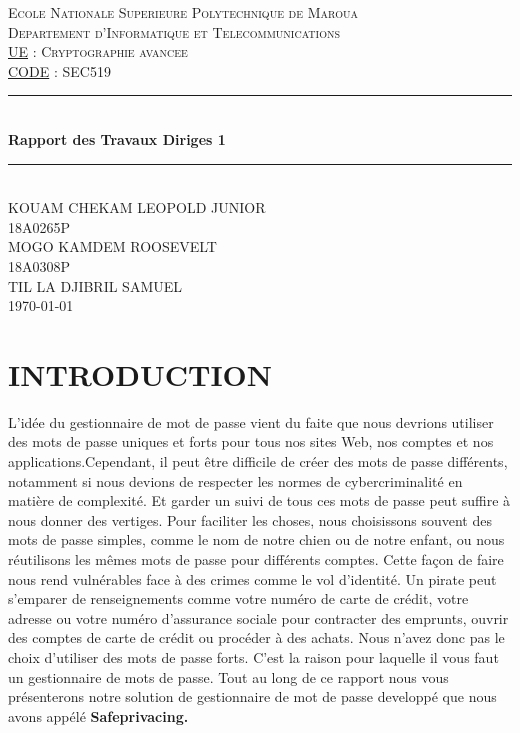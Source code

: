 \documentclass[11pt,a4paper]{report}
\begin{document}
\begin{titlepage}
\newcommand{\HRule}{\rule{\linewidth}{0.5mm}}
\center
\textsc{\LARGE
Ecole Nationale Superieure Polytechnique de Maroua
} \\[1cm]
\textsc{\Large
Departement d'Informatique et Telecommunications
} \\[1cm]
\textsc{\large
\underline{UE} : Cryptographie avancee \\ \underline{CODE} : SEC519
} \\[1cm]
\HRule \\[0.4cm]
{ \huge \bfseries Rapport des Travaux Diriges 1  \\[0.15cm]}
\HRule \\[1.5cm]
KOUAM CHEKAM LEOPOLD JUNIOR \\
18A0265P \\[1cm]
MOGO KAMDEM ROOSEVELT\\
18A0308P \\[1cm]

TIL LA DJIBRIL SAMUEL\\
 
\today \\ [1cm]
\end{titlepage}
\newpage
\tableofcontents

\chapter*{INTRODUCTION}
L'idée du gestionnaire de mot de passe vient du faite que nous devrions utiliser des mots de passe uniques et forts pour tous nos sites Web, nos comptes et nos applications.Cependant, il peut être difficile de créer des mots de passe différents, notamment si nous devions de respecter les normes de cybercriminalité en matière de complexité. Et garder un suivi de tous ces mots de passe peut suffire à nous donner des vertiges. Pour faciliter les choses, nous choisissons souvent des mots de passe simples, comme le nom de notre chien ou de notre enfant, ou nous réutilisons les mêmes mots de passe pour différents comptes. Cette façon de faire nous rend vulnérables face à des crimes comme le vol d'identité. Un pirate peut s’emparer de renseignements comme votre numéro de carte de crédit, votre adresse ou votre numéro d'assurance sociale pour contracter des emprunts, ouvrir des comptes de carte de crédit ou procéder à des achats. Nous n’avez donc pas le choix d’utiliser des mots de passe forts. C’est la raison pour laquelle il vous faut un gestionnaire de mots de passe. Tout au long de ce rapport nous vous présenterons notre solution de gestionnaire de mot de passe developpé que nous avons appélé \textbf{Safeprivacing.
}
\end{document}
